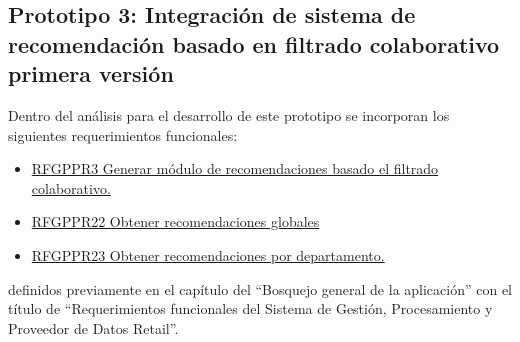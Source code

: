 \subsection{Prototipo 3: Integración de sistema de recomendación basado en filtrado colaborativo primera versión}
Dentro del análisis para el desarrollo de este prototipo se incorporan los siguientes requerimientos funcionales: \\
\begin{itemize}
	\item \hyperlink{RFSGPyPDR}{RFGPPR3 Generar módulo de recomendaciones basado el filtrado colaborativo.}
	\item \hyperlink{RFSGPyPDR}{RFGPPR22 Obtener recomendaciones globales}
	\item \hyperlink{RFSGPyPDR}{RFGPPR23 Obtener recomendaciones por departamento.}
\end{itemize}

definidos previamente en el capítulo del ``Bosquejo general de la aplicación''  con el título de ``Requerimientos funcionales del Sistema de Gestión, Procesamiento y Proveedor de Datos Retail''. \\ \par

